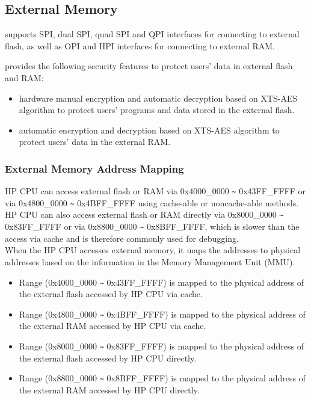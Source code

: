 \documentclass[main\_\_EN.tex]{subfiles}
\begin{document}
\subsection{External Memory}
\label{para:sysmem-external-memory}

\chipname{} supports SPI, dual SPI, quad SPI and QPI interfaces for connecting to external flash, as well as OPI and HPI interfaces for connecting to external RAM.

\chipname{} provides the following security features to protect users' data in external flash and RAM:
\begin{itemize}
    \item hardware manual encryption and automatic decryption based on XTS-AES algorithm to protect users' programs and data stored in the external flash.
    \item automatic encryption and decryption based on XTS-AES algorithm to protect users' data in the external RAM.
\end{itemize}

\subsubsection{External Memory Address Mapping}

HP CPU can access external flash or RAM via 0x4000\_0000 \verb+~+ 0x43FF\_FFFF or via 0x4800\_0000 \verb+~+ 0x4BFF\_FFFF using cache-able or noncache-able methods. HP CPU can also access external flash or RAM directly via 0x8000\_0000 \verb+~+ 0x83FF\_FFFF or via 0x8800\_0000 \verb+~+ 0x8BFF\_FFFF, which is slower than the access via cache and is therefore commonly used for debugging.\\

When the HP CPU accesses external memory, it maps the addresses to physical addresses based on the information in the Memory Management Unit (MMU).
\begin{itemize}
    \item Range (0x4000\_0000 \verb+~+ 0x43FF\_FFFF) is mapped to the physical address of the external flash accessed by HP CPU via cache.
    \item Range (0x4800\_0000 \verb+~+ 0x4BFF\_FFFF) is mapped to the physical address of the external RAM accessed by HP CPU via cache.
    \item Range (0x8000\_0000 \verb+~+ 0x83FF\_FFFF) is mapped to the physical address of the external flash accessed by HP CPU directly.
    \item Range (0x8800\_0000 \verb+~+ 0x8BFF\_FFFF) is mapped to the physical address of the external RAM accessed by HP CPU directly.
\end{itemize}
\end{document}
